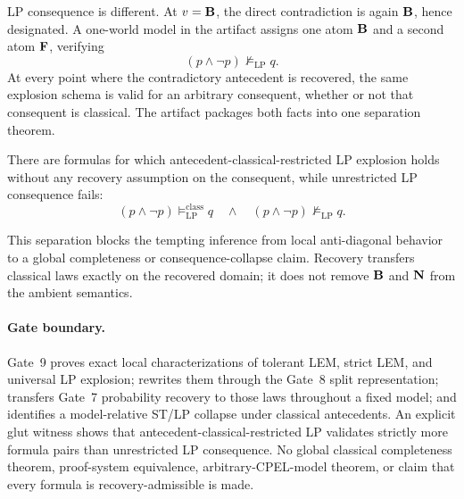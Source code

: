 LP consequence is different. At \(v=\mathbf{B}\), the direct contradiction is again
\(\mathbf{B}\), hence designated. A one-world model in the artifact assigns one atom
\(\mathbf{B}\) and a second atom \(\mathbf{F}\), verifying
\[
(p\land\neg p)\not\models_{\mathrm{LP}}q.
\]
At every point where the contradictory antecedent is recovered, the same explosion
schema is valid for an arbitrary consequent, whether or not that consequent is
classical. The artifact packages both facts into one separation theorem.

\begin{theorem}
\label{thm:gate9-explosion-boundary}
There are formulas for which antecedent-classical-restricted LP explosion holds
without any recovery assumption on the consequent, while unrestricted LP consequence
fails:
\[
\boxed{
(p\land\neg p)\models^{\mathrm{class}}_{\mathrm{LP}}q
\quad\land\quad
(p\land\neg p)\not\models_{\mathrm{LP}}q.
}
\]
\statuswitness
\end{theorem}

This separation blocks the tempting inference from local anti-diagonal behavior to a
global completeness or consequence-collapse claim. Recovery transfers classical
laws exactly on the recovered domain; it does not remove \(\mathbf{B}\) and \(\mathbf{N}\)
from the ambient semantics.

\paragraph{Gate boundary.}
Gate~9 proves exact local characterizations of tolerant LEM, strict LEM, and
universal LP explosion; rewrites them through the Gate~8 split representation;
transfers Gate~7 probability recovery to those laws throughout a fixed model; and
identifies a model-relative ST/LP collapse under classical antecedents. An explicit
glut witness shows that antecedent-classical-restricted LP validates strictly more
formula pairs than unrestricted LP consequence. No global classical completeness
theorem, proof-system equivalence, arbitrary-CPEL-model theorem, or claim that every
formula is recovery-admissible is made.
